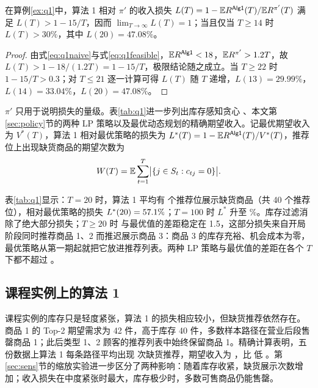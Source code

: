 \begin{proposition}\label{prop:q1}
在算例\ref{ex:q1}中，算法 1 相对 $\pi'$ 的收入损失 $L(T)=1-\mathbb E R^{\textsf{Alg1}}(T)/\mathbb E R^{\pi'}(T)$ 满足 $L(T)>1-15/T$，因而 $\lim_{T\to\infty}L(T)=1$；当且仅当 $T\ge14$ 时 $L(T)>30\%$，其中 $L(20)=47.08\%$。
\end{proposition}
\begin{proof}
由式\eqref{eq:q1naive}与式\eqref{eq:q1feasible}，$\mathbb E R^{\textsf{Alg1}}<18$，$\mathbb E R^{\pi'}>1.2T$，故 $L(T)>1-18/(1.2T)=1-15/T$，极限结论随之成立。当 $T\ge22$ 时 $1-15/T>0.3$；对 $T\le21$ 逐一计算可得 $L(T)$ 随 $T$ 递增，$L(13)=29.99\%$，$L(14)=33.04\%$，$L(20)=47.08\%$。
\end{proof}

$\pi'$ 只用于说明损失的量级。表\ref{tab:q1}进一步列出库存感知贪心 \Greedy{}、本文第\ref{sec:policy}节的两种 LP 策略以及最优动态规划的精确期望收入。记最优期望收入为 $V^{*}(T)$，算法 1 相对最优策略的损失为 $L^{*}(T)=1-\mathbb E R^{\textsf{Alg1}}(T)/V^{*}(T)$，推荐位上出现缺货商品的期望次数为
\begin{equation}
W(T)=\mathbb E\sum_{t=1}^{T}\bigl|\{j\in S_t: c_{tj}=0\}\bigr|.
\label{eq:waste}
\end{equation}



表\ref{tab:q1}显示：$T=20$ 时，算法 1 平均有 \QoneWasteTwenty{} 个推荐位展示缺货商品（共 40 个推荐位），相对最优策略的损失 $L^{*}(20)=57.1\%$；$T=100$ 时 $L^{*}$ 升至 \QoneLossOptHundred\%。库存过滤消除了绝大部分损失；$T\ge20$ 时 \Greedy{} 与最优值的差距稳定在 1.5，这部分损失来自开局阶段同时推荐商品 1、2 而推迟展示商品 3：商品 3 的库存充裕、机会成本为零，最优策略从第一期起就把它放进推荐列表。两种 LP 策略与最优值的差距在各个 $T$ 下都不超过 \QoneLPMaxGap{}。

\subsection{课程实例上的算法 1}\label{sec:q1course}
课程实例的库存只是轻度紧张，算法 1 的损失相应较小，但缺货推荐依然存在。商品 1 的 Top-2 期望需求为 42 件，高于库存 40 件，多数样本路径在营业后段售罄商品 1；此后类型 1、2 顾客的推荐列表中始终保留商品 1。精确计算表明，五份数据上算法 1 每条路径平均出现 \AlgOneOOS{} 次缺货推荐，期望收入为 \AlgOneER{}，比 \Greedy{} 低 \AlgOneLossGreedy{}。第\ref{sec:sens}节的缩放实验进一步区分了两种影响：随着库存收紧，缺货展示次数增加；收入损失在中度紧张时最大，库存极少时，多数可售商品仍能售罄。
